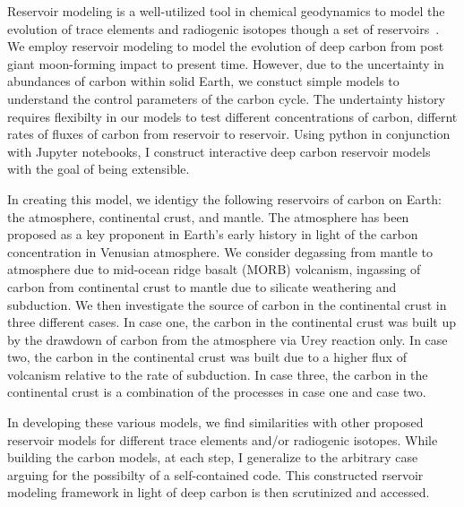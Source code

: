 Reservoir modeling is a well-utilized tool in chemical geodynamics to model the evolution of trace elements and radiogenic isotopes though a set of reservoirs~\cite{ACJ-BO-DB:1980, KLH-WGJ:1990, SNH-ZK:2001}. We employ reservoir modeling to model the evolution of deep carbon from post giant moon-forming impact to present time. However, due to the uncertainty in abundances of carbon within solid Earth, we constuct simple models to understand the control parameters of the carbon cycle. The undertainty history requires flexibilty in our models to test different concentrations of carbon, differnt rates of fluxes of carbon from reservoir to reservoir. Using python in conjunction with Jupyter notebooks, I construct interactive deep carbon reservoir models with the goal of being extensible. 

In creating this model, we identigy the following reservoirs of carbon on Earth: the atmosphere, continental crust, and mantle. The atmosphere has been proposed as a key proponent in Earth's early history in light of the carbon concentration in Venusian atmosphere. We consider degassing from mantle to atmosphere due to mid-ocean ridge basalt (MORB) volcanism, ingassing of carbon from continental crust to mantle due to silicate weathering and subduction. We then investigate the source of carbon in the continental crust in three different cases. In case one, the carbon in the continental crust was built up by the drawdown of carbon from the atmosphere via Urey reaction only. In case two, the carbon in the continental crust was built due to a higher flux of volcanism relative to the rate of subduction. In case three, the carbon in the continental crust is a combination of the processes in case one and case two.

In developing these various models, we find similarities with other proposed reservoir models for different trace elements and/or radiogenic isotopes. While building the carbon models, at each step, I generalize to the arbitrary case arguing for the possibilty of a self-contained code. This constructed rservoir modeling framework in light of deep carbon is then scrutinized and accessed.

